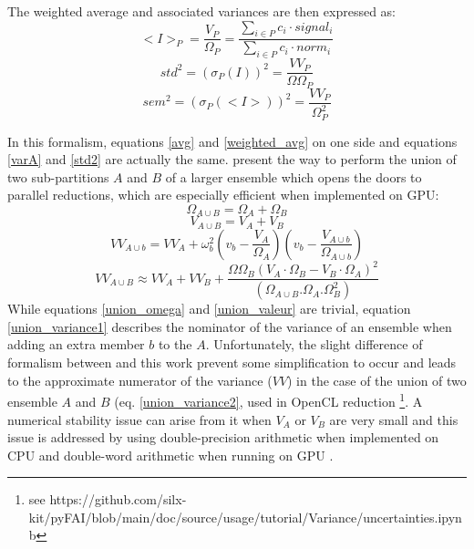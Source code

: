 \documentclass[preprint]{iucr}              %
\begin{document}
The weighted average and associated variances are then expressed as:
\begin{equation}
\label{weighted_avg}
<I>_P = \frac{V_{P}}{\Omega_{P}} =  \frac{\sum\limits_{i \in P} c_i \cdot signal_i}
                        {\sum\limits_{i \in P} c_i \cdot norm_i} 
\end{equation}
\begin{equation}
\label{std2}
std^2 = (\sigma_P(I))^2 = \frac{VV_{P}}{\Omega\Omega_{P}}
\end{equation}
\begin{equation}
\label{sem2}
sem^2 = (\sigma_P(<I>))^2 = \frac{VV_{P}}{\Omega_{P}^2}
\end{equation}

In this formalism, equations \ref{avg} and \ref{weighted_avg} on one side and equations \ref{varA} and \ref{std2} are actually the same.
 present the way to perform the union of two sub-partitions $A$ and $B$ of a larger ensemble which opens the doors to parallel reductions, which are especially efficient when implemented on GPU:
\begin{equation}
\label{union_omega}
\Omega_{A \cup B} =  \Omega_{A} + \Omega_{B} 
\end{equation}
\begin{equation}
\label{union_valeur}
V_{A \cup B} =  V_{A} + V_{B} 
\end{equation}
\begin{equation}
\label{union_variance1}
VV_{A \cup b} =  VV_{A}  +  \omega_b^2(v_b-\frac{V_A}{\Omega_A})(v_b-\frac{V_{A\cup b}}{\Omega_{A\cup b}})
\end{equation}
\begin{equation}
\label{union_variance2}
VV_{A \cup B} \approx  VV_{A} + VV_{B} +  \frac{\Omega\Omega_{B}(V_A\cdot \Omega_B-V_B\cdot \Omega_A)^2}{(\Omega_{A\cup B}.\Omega_A.\Omega_B^2)}
\end{equation}
While equations \ref{union_omega} and \ref{union_valeur} are trivial, equation \ref{union_variance1} describes the nominator of the variance of an ensemble when adding an extra member $b$ to the $A$.
Unfortunately, the slight difference of formalism between  and this work prevent some simplification to occur and leads to the approximate numerator of the variance ($VV$) in the case of the union of two ensemble $A$ and $B$ (eq. \ref{union_variance2}, used in OpenCL reduction \footnote{see https://github.com/silx-kit/pyFAI/blob/main/doc/source/usage/tutorial/Variance/uncertainties.ipynb}.
A numerical stability issue can arise from it when $V_A$ or $V_B$ are very small and this issue is addressed by using double-precision arithmetic when implemented on CPU and double-word arithmetic when running on GPU \cite{double_word}.
\end{document}
